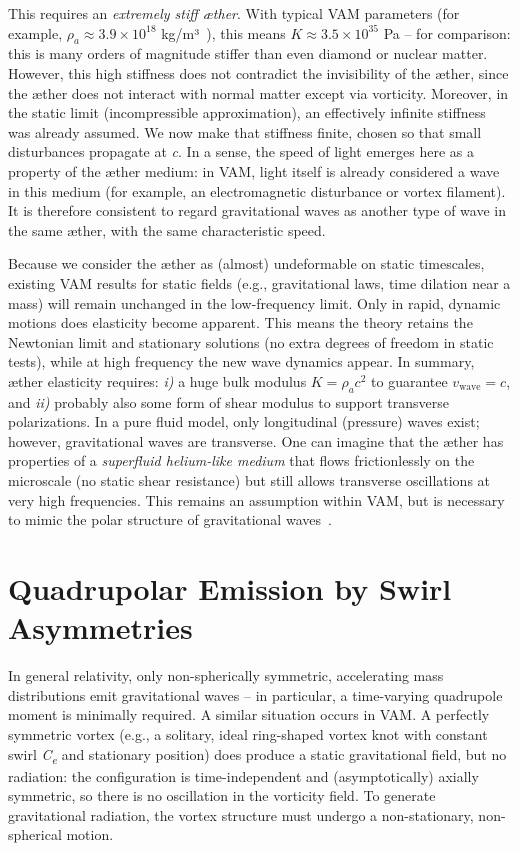 This requires an \textit{extremely stiff æther}. With typical VAM parameters (for example, $ρ_a \approx 3.9\times10^{18}$ kg/m³~\cite{iskandarani2025VAM2}), this means $K \approx 3.5\times10^{35}$ Pa – for comparison: this is many orders of magnitude stiffer than even diamond or nuclear matter. However, this high stiffness does not contradict the invisibility of the æther, since the æther does not interact with normal matter except via vorticity. Moreover, in the static limit (incompressible approximation), an effectively infinite stiffness was already assumed. We now make that stiffness finite, chosen so that small disturbances propagate at \textit{c}. In a sense, the speed of light emerges here as a property of the æther medium: in VAM, light itself is already considered a wave in this medium (for example, an electromagnetic disturbance or vortex filament). It is therefore consistent to regard gravitational waves as another type of wave in the same æther, with the same characteristic speed.

Because we consider the æther as (almost) undeformable on static timescales, existing VAM results for static fields (e.g., gravitational laws, time dilation near a mass) will remain unchanged in the low-frequency limit. Only in rapid, dynamic motions does elasticity become apparent. This means the theory retains the Newtonian limit and stationary solutions (no extra degrees of freedom in static tests), while at high frequency the new wave dynamics appear. In summary, æther elasticity requires: \textit{i)} a huge bulk modulus $K = ρ_a c^2$ to guarantee $v_{\text{wave}} = c$, and \textit{ii)} probably also some form of shear modulus to support transverse polarizations. In a pure fluid model, only longitudinal (pressure) waves exist; however, gravitational waves are transverse. One can imagine that the æther has properties of a \textit{superfluid helium-like medium} that flows frictionlessly on the microscale (no static shear resistance) but still allows transverse oscillations at very high frequencies. This remains an assumption within VAM, but is necessary to mimic the polar structure of gravitational waves~\cite{iskandarani2025VAM3}.

\section*{Quadrupolar Emission by Swirl Asymmetries}
In general relativity, only non-spherically symmetric, accelerating mass distributions emit gravitational waves – in particular, a time-varying quadrupole moment is minimally required. A similar situation occurs in VAM. A perfectly symmetric vortex (e.g., a solitary, ideal ring-shaped vortex knot with constant swirl \textit{C\textsubscript{e}} and stationary position) does produce a static gravitational field, but no radiation: the configuration is time-independent and (asymptotically) axially symmetric, so there is no oscillation in the vorticity field. To generate gravitational radiation, the vortex structure must undergo a non-stationary, non-spherical motion.

